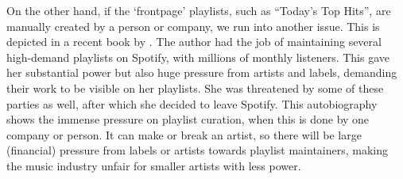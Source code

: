 On the other hand, if the `frontpage' playlists, such as ``Today's Top Hits'', are manually created by a person or company, we run into another issue. This is depicted in a recent book by \cite{heuvelings2020}. The author had the job of maintaining several high-demand playlists on Spotify, with millions of monthly listeners. This gave her substantial power but also huge pressure from artists and labels, demanding their work to be visible on her playlists. She was threatened by some of these parties as well, after which she decided to leave Spotify. This autobiography shows the immense pressure on playlist curation, when this is done by one company or person. It can make or break an artist, so there will be large (financial) pressure from labels or artists towards playlist maintainers, making the music industry unfair for smaller artists with less power.
